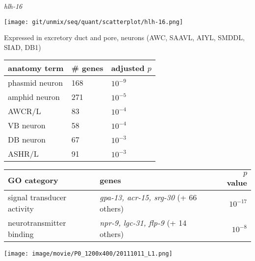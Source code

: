 \documentclass[serif,9pt]{beamer}
\begin{document}
\begin{frame}{{\em hlh-16}}

\begin{minipage}{0.4\textwidth}
\texttt{[image: git/unmix/seq/quant/scatterplot/hlh-16.png]}
\end{minipage}
\begin{minipage}{0.58\textwidth}
{\small Expressed in excretory duct and pore,
neurons (AWC, SAAVL, AIYL, SMDDL, SIAD, DB1)}

\begin{table}[!tbp]\scriptsize
\begin{tabular}{lll}
anatomy term & \# genes & adjusted $p$ \\
\hline
phasmid neuron & 168 & $10^{-9}$ \\
amphid neuron & 271 & $10^{-5}$ \\
AWCR/L & 83 & $10^{-4}$ \\
VB neuron & 58 & $10^{-4}$ \\
DB neuron & 67 & $10^{-3}$ \\
ASHR/L & 91 & $10^{-3}$ \\
\hline

\end{tabular}
\end{table}
\end{minipage}

\begin{table}\footnotesize
\begin{tabular}{llr}
GO category & genes & $p$ value \\
\hline
signal transducer activity & {\em gpa-13, acr-15, srg-30} (+ 66 others) & $10^{-17}$ \\
neurotransmitter binding & {\em npr-9, lgc-31, flp-9} (+ 14 others) & $10^{-8}$ \\
\end{tabular}
\end{table}

\texttt{[image: image/movie/P0\_1200x400/20111011\_L1.png]}

\end{frame}
\end{document}
